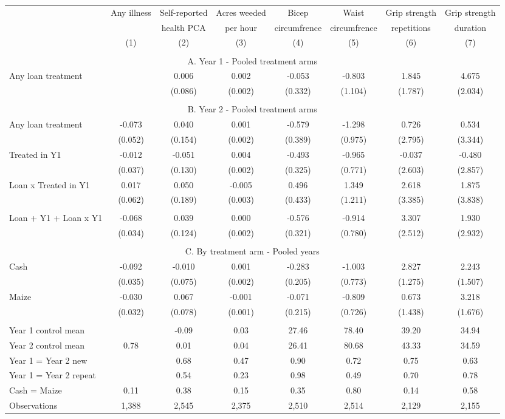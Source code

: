 \begin{tabular}{l cc ccccc}
\hline
 & Any illness & Self-reported & Acres weeded & Bicep & Waist & Grip strength & Grip strength \\ 
 & & health PCA & per hour & circumfrence & circumfrence & repetitions & duration \\ 
 & (1) & (2) & (3) & (4) & (5) & (6) & (7) \\ 
\hline
 \\ 
\multicolumn{8}{c}{A. Year 1 - Pooled treatment arms} \\ 
Any loan treatment &   & 0.006 & 0.002 & -0.053 & -0.803 & 1.845 & 4.675 \\
 &  & (0.086) & (0.002) & (0.332) & (1.104) & (1.787) & (2.034) \\
 \\ 
\multicolumn{8}{c}{B. Year 2 - Pooled treatment arms} \\ 
Any loan treatment & -0.073 & 0.040 & 0.001 & -0.579 & -1.298 & 0.726 & 0.534 \\
 & (0.052) & (0.154) & (0.002) & (0.389) & (0.975) & (2.795) & (3.344) \\
Treated in Y1 & -0.012 & -0.051 & 0.004 & -0.493 & -0.965 & -0.037 & -0.480 \\
 & (0.037) & (0.130) & (0.002) & (0.325) & (0.771) & (2.603) & (2.857) \\
Loan x Treated in Y1 & 0.017 & 0.050 & -0.005 & 0.496 & 1.349 & 2.618 & 1.875 \\
 & (0.062) & (0.189) & (0.003) & (0.433) & (1.211) & (3.385) & (3.838) \\
 \\ 
Loan + Y1 + Loan x Y1 & -0.068 & 0.039 & 0.000 & -0.576 & -0.914 & 3.307 & 1.930 \\
 & (0.034) & (0.124) & (0.002) & (0.321) & (0.780) & (2.512) & (2.932) \\
 \\ 
\multicolumn{8}{c}{C. By treatment arm - Pooled years} \\ 
Cash & -0.092 & -0.010 & 0.001 & -0.283 & -1.003 & 2.827 & 2.243 \\
 & (0.035) & (0.075) & (0.002) & (0.205) & (0.773) & (1.275) & (1.507) \\
Maize & -0.030 & 0.067 & -0.001 & -0.071 & -0.809 & 0.673 & 3.218 \\
 & (0.032) & (0.078) & (0.001) & (0.215) & (0.726) & (1.438) & (1.676) \\
 \\ 
\hline
Year 1 control mean &  & -0.09 & 0.03 & 27.46 & 78.40 & 39.20 & 34.94 \\
Year 2 control mean & 0.78 & 0.01 & 0.04 & 26.41 & 80.68 & 43.33 & 34.59 \\
Year 1 = Year 2 new &  & 0.68 & 0.47 & 0.90 & 0.72 & 0.75 & 0.63 \\
Year 1 = Year 2 repeat &  & 0.54 & 0.23 & 0.98 & 0.49 & 0.70 & 0.78 \\
Cash = Maize & 0.11 & 0.38 & 0.15 & 0.35 & 0.80 & 0.14 & 0.58 \\
Observations &     1,388 &     2,545 &     2,375 &     2,510 &     2,514 &     2,129 &     2,155 \\
\hline
\end{tabular}
